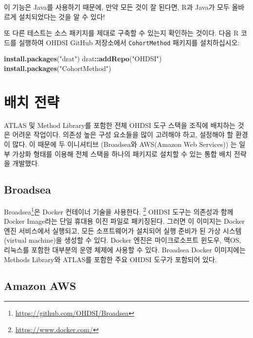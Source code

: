 \documentclass[11pt]{book}
\newenvironment{Shaded}{\begin{snugshade}}{\end{snugshade}}
\newcommand{\KeywordTok}[1]{\textcolor[rgb]{0.13,0.29,0.53}{\textbf{#1}}}
\newcommand{\StringTok}[1]{\textcolor[rgb]{0.31,0.60,0.02}{#1}}
\newcommand{\OperatorTok}[1]{\textcolor[rgb]{0.81,0.36,0.00}{\textbf{#1}}}
\newcommand{\NormalTok}[1]{#1}
\let\rmarkdownfootnote\footnote%
\def\footnote{\protect\rmarkdownfootnote}
\theoremstyle{definition}
\theoremstyle{definition}
\theoremstyle{definition}
\theoremstyle{remark}
\begin{document}
이 기능은 Java를 사용하기 때문에, 만약 모든 것이 잘 된다면, R과 Java가
모두 올바르게 설치되었다는 것을 알 수 있다!

또 다른 테스트는 소스 패키지를 제대로 구축할 수 있는지 확인하는 것이다.
다음 R 코드를 실행하여 OHDSI GitHub 저장소에서 \texttt{CohortMethod}
패키지를 설치하십시오:

\begin{Shaded}
\begin{Highlighting}[]
\KeywordTok{install.packages}\NormalTok{(}\StringTok{"drat"}\NormalTok{)}
\NormalTok{drat}\OperatorTok{::}\KeywordTok{addRepo}\NormalTok{(}\StringTok{"OHDSI"}\NormalTok{)}
\KeywordTok{install.packages}\NormalTok{(}\StringTok{"CohortMethod"}\NormalTok{)}
\end{Highlighting}
\end{Shaded}

\section{배치 전략}\label{-}

ATLAS 및 Method Library를 포함한 전체 OHDSI 도구 스택을 조직에 배치하는
것은 어려운 작업이다. 의존성 높은 구성 요소들을 많이 고려해야 하고,
설정해야 할 환경이 많다. 이 때문에 두 이니셔티브 (Broadsea와 AWS(Amazon
Web Services)) 는 일부 가상화 형태를 이용해 전체 스택을 하나의 패키지로
설치할 수 있는 통합 배치 전략을 개발했다. 

\subsection{Broadsea}\label{broadsea}

Broadsea\footnote{\url{https://github.com/OHDSI/Broadsea}}은 Docker
컨테이너 기술을 사용한다. \footnote{\url{https://www.docker.com/}} OHDSI
도구는 의존성과 함께 Docker Image라는 단일 휴대용 이진 파일로
패키징된다. 그러면 이 이미지는 Docker 엔진 서비스에서 실행되고, 모든
소프트웨어가 설치되어 실행 준비가 된 가상 시스템(virtual machine)을
생성할 수 있다. Docker 엔진은 마이크로소프트 윈도우, 맥OS, 리눅스를
포함한 대부분의 운영 체제에 사용할 수 있다. Broadsea Docker 이미지에는
Methods Library와 ATLAS를 포함한 주요 OHDSI 도구가 포함되어 있다.

\subsection{Amazon AWS}\label{amazon-aws}
\end{document}
